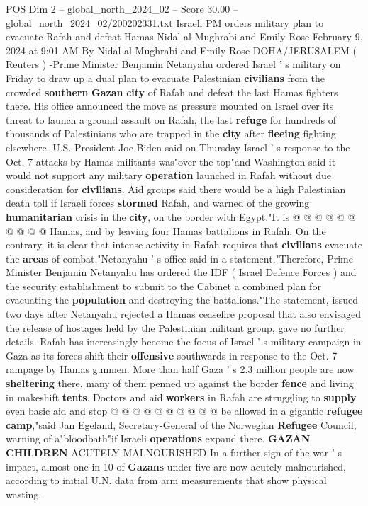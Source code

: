 \begin{textsample}{POS Dim 2 – global\_north\_2024\_02 – Score 30.00 – global\_north\_2024\_02/200202331.txt}  \label{ex:f2_pos_148}
Israeli PM orders military plan to evacuate Rafah and defeat Hamas Nidal al-Mughrabi and Emily Rose February 9, 2024 at 9:01 AM By Nidal al-Mughrabi and Emily Rose DOHA/JERUSALEM ( Reuters ) -Prime Minister Benjamin Netanyahu ordered Israel ' s military on Friday to draw up a dual plan to evacuate Palestinian \textbf{civilians} from the crowded \textbf{southern} \textbf{Gazan} \textbf{city} of Rafah and defeat the last Hamas fighters there.
His office announced the move as pressure mounted on Israel over its threat to launch a ground assault on Rafah, the last \textbf{refuge} for hundreds of thousands of Palestinians who are trapped in the \textbf{city} after \textbf{fleeing} fighting elsewhere.
U.S.
President Joe Biden said on Thursday Israel ' s response to the Oct. 7 attacks by Hamas militants was"over the top"and Washington said it would not support any military \textbf{operation} launched in Rafah without due consideration for \textbf{civilians}.
Aid groups said there would be a high Palestinian death toll if Israeli forces \textbf{stormed} Rafah, and warned of the growing \textbf{humanitarian} crisis in the \textbf{city}, on the border with Egypt."It is @ @ @ @ @ @ @ @ @ @ Hamas, and by leaving four Hamas battalions in Rafah.
On the contrary, it is clear that intense activity in Rafah requires that \textbf{civilians} evacuate the \textbf{areas} of combat,"Netanyahu ' s office said in a statement."Therefore, Prime Minister Benjamin Netanyahu has ordered the IDF ( Israel Defence Forces ) and the security establishment to submit to the Cabinet a combined plan for evacuating the \textbf{population} and destroying the battalions."The statement, issued two days after Netanyahu rejected a Hamas ceasefire proposal that also envisaged the release of hostages held by the Palestinian militant group, gave no further details.
Rafah has increasingly become the focus of Israel ' s military campaign in Gaza as its forces shift their \textbf{offensive} southwards in response to the Oct. 7 rampage by Hamas gunmen.
More than half Gaza ' s 2.3 million people are now \textbf{sheltering} there, many of them penned up against the border \textbf{fence} and living in makeshift \textbf{tents}.
Doctors and aid \textbf{workers} in Rafah are struggling to \textbf{supply} even basic aid and stop @ @ @ @ @ @ @ @ @ @ be allowed in a gigantic \textbf{refugee} \textbf{camp},"said Jan Egeland, Secretary-General of the Norwegian \textbf{Refugee} Council, warning of a"bloodbath"if Israeli \textbf{operations} expand there. \textbf{GAZAN} \textbf{CHILDREN} ACUTELY MALNOURISHED In a further sign of the war ' s impact, almost one in 10 of \textbf{Gazans} under five are now acutely malnourished, according to initial U.N. data from arm measurements that show physical wasting.

\end{textsample}
